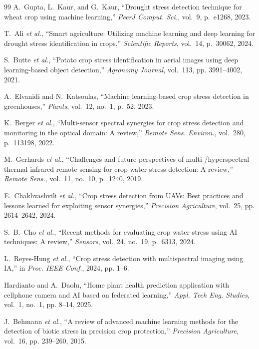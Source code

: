 \documentclass[10pt,journal,compsoc]{IEEEtran}
\begin{document}
\begin{thebibliography}{99}
A.~Gupta, L.~Kaur, and G.~Kaur, ``Drought stress detection technique for wheat crop using machine learning,'' \textit{PeerJ Comput. Sci.}, vol.~9, p.~e1268, 2023.

T.~Ali \textit{et al.}, ``Smart agriculture: Utilizing machine learning and deep learning for drought stress identification in crops,'' \textit{Scientific Reports}, vol.~14, p.~30062, 2024.

S.~Butte \textit{et al.}, ``Potato crop stress identification in aerial images using deep learning-based object detection,'' \textit{Agronomy Journal}, vol.~113, pp. 3991--4002, 2021.

A.~Elvanidi and N.~Katsoulas, ``Machine learning-based crop stress detection in greenhouses,'' \textit{Plants}, vol.~12, no.~1, p.~52, 2023.

K.~Berger \textit{et al.}, ``Multi-sensor spectral synergies for crop stress detection and monitoring in the optical domain: A review,'' \textit{Remote Sens. Environ.}, vol.~280, p.~113198, 2022.

M.~Gerhards \textit{et al.}, ``Challenges and future perspectives of multi-/hyperspectral thermal infrared remote sensing for crop water-stress detection: A review,'' \textit{Remote Sens.}, vol.~11, no.~10, p.~1240, 2019.

E.~Chakhvashvili \textit{et al.}, ``Crop stress detection from UAVs: Best practices and lessons learned for exploiting sensor synergies,'' \textit{Precision Agriculture}, vol.~25, pp. 2614--2642, 2024.

S.~B.~Cho \textit{et al.}, ``Recent methods for evaluating crop water stress using AI techniques: A review,'' \textit{Sensors}, vol.~24, no.~19, p.~6313, 2024.

L.~Reyes-Hung \textit{et al.}, ``Crop stress detection with multispectral imaging using IA,'' in \textit{Proc. IEEE Conf.}, 2024, pp. 1--6.

Hardianto and A.~Daolu, ``Home plant health prediction application with cellphone camera and AI based on federated learning,'' \textit{Appl. Tech Eng. Studies}, vol.~1, no.~1, pp. 8--14, 2025.

J.~Behmann \textit{et al.}, ``A review of advanced machine learning methods for the detection of biotic stress in precision crop protection,'' \textit{Precision Agriculture}, vol.~16, pp. 239--260, 2015.

\end{thebibliography}
\end{document}

